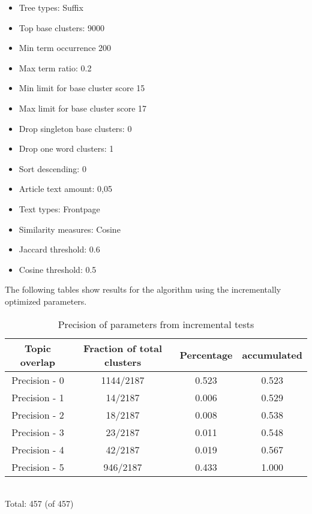 \begin{itemize}
  \item Tree types: Suffix
  \item Top base clusters: 9000
  \item Min term occurrence 200
  \item Max term ratio: 0.2
  \item Min limit for base cluster score 15
  \item Max limit for base cluster score 17
  \item Drop singleton base clusters: 0
  \item Drop one word clusters: 1
  \item Sort descending: 0
  \item Article text amount: 0,05
  \item Text types: Frontpage
  \item Similarity measures: Cosine
  \item Jaccard threshold: 0.6
  \item Cosine threshold: 0.5
\end{itemize}

The following tables show results for the \CTC algorithm using the incrementally optimized parameters.

\begin{table}
\begin{center}
\begin{tabular}{|c|c|c|c|}
\hline
Topic overlap &  Fraction of total clusters & Percentage  & accumulated\\ 
\hline
Precision - 0 & 1144/2187 & 0.523 & 0.523 \\
Precision - 1 & 14/2187 & 0.006 & 0.529 \\
Precision - 2 & 18/2187 & 0.008 & 0.538\\
Precision - 3 & 23/2187 & 0.011 & 0.548\\
Precision - 4 & 42/2187 & 0.019 & 0.567\\
Precision - 5 & 946/2187 & 0.433 & 1.000\\
\hline
\end{tabular}
\\Total: 457 (of  457)
\end{center}
\caption{Precision of parameters from incremental tests}
\label{tab:incrementalparametersgroundtruth}
\end{table}


